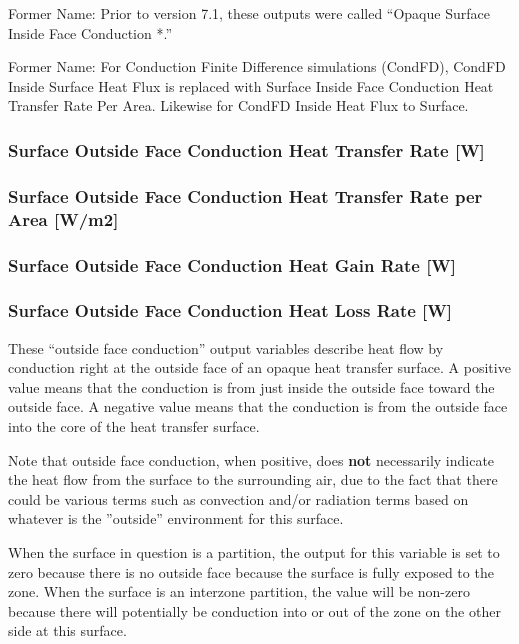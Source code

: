 Former Name: Prior to version 7.1, these outputs were called ``Opaque Surface Inside Face Conduction *.''

Former Name: For Conduction Finite Difference simulations (CondFD), CondFD Inside Surface Heat Flux is replaced with Surface Inside Face Conduction Heat Transfer Rate Per Area. Likewise for CondFD Inside Heat Flux to Surface.

\subsubsection{Surface Outside Face Conduction Heat Transfer Rate {[}W{]}}\label{surface-outside-face-conduction-heat-transfer-rate-w}

\subsubsection{Surface Outside Face Conduction Heat Transfer Rate per Area {[}W/m2{]}}\label{surface-outside-face-conduction-heat-transfer-rate-per-area-wm2}

\subsubsection{Surface Outside Face Conduction Heat Gain Rate {[}W{]}}\label{surface-outside-face-conduction-heat-gain-rate-w}

\subsubsection{Surface Outside Face Conduction Heat Loss Rate {[}W{]}}\label{surface-outside-face-conduction-heat-loss-rate-w}

These ``outside face conduction'' output variables describe heat flow by conduction right at the outside face of an opaque heat transfer surface. A positive value means that the conduction is from just inside the outside face toward the outside face. A negative value means that the conduction is from the outside face into the core of the heat transfer surface.

Note that outside face conduction, when positive, does \textbf{not} necessarily indicate the heat flow from the surface to the surrounding air, due to the fact that there could be various terms such as convection and/or radiation terms based on whatever is the ''outside'' environment for this surface.

When the surface in question is a partition, the output for this variable is set to zero because there is no outside face because the surface is fully exposed to the zone.  When the surface is an interzone partition, the value will be non-zero because there will potentially be conduction into or out of the zone on the other side at this surface.

